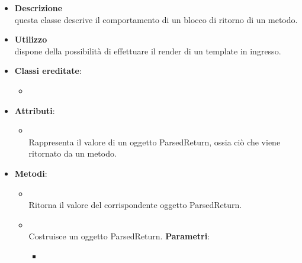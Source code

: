 \label{\nogloxy{swedesigner::server::project::ParsedReturn}}
\begin{figure}[h]
\centering
{}
\caption{}
\end{figure}
\FloatBarrier
\begin{itemize}
\item \textbf{Descrizione}\\
questa classe descrive il comportamento di un blocco di ritorno di un metodo.
\item \textbf{Utilizzo}\\
dispone della possibilità di effettuare il render di un template in ingresso.
\item \textbf{Classi ereditate}:
\begin{itemize}
\item \hyperref[\nogloxy{swedesigner::server::project::ParsedInstruction}]{}
\end{itemize}
\item \textbf{Attributi}:
\begin{itemize}
\item {}
\\ Rappresenta il valore di un oggetto ParsedReturn, ossia ciò che viene ritornato da un metodo.
\end{itemize}
\item \textbf{Metodi}:
\begin{itemize}
\item {}
\\ Ritorna il valore del corrispondente oggetto ParsedReturn.
\item {}
\\ Costruisce un oggetto ParsedReturn.
\textbf{Parametri}:
\begin{itemize}
\item {}

\end{itemize}
\end{itemize}
\end{itemize}
